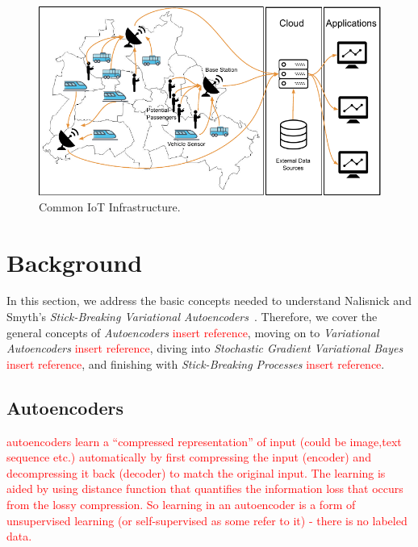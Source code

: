 \begin{figure}[h]
  \centering
  \includegraphics[width=\linewidth]{figs/iot_scenario}
  \caption{Common IoT Infrastructure.}
  \label{fig:iot-app-scenario}
\end{figure}
\section{Background}
\label{sec:background}
% 
% 

In this section, we address the basic concepts needed to understand Nalisnick and Smyth's \textit{Stick-Breaking Variational Autoencoders}~\cite{nalisnick2016stickbreaking}. Therefore, we cover the general concepts of \textit{Autoencoders} \textcolor{red}{insert reference}, moving on to \textit{Variational Autoencoders} \textcolor{red}{insert reference}, diving into \textit{Stochastic Gradient Variational Bayes} \textcolor{red}{insert reference}, and finishing with \textit{Stick-Breaking Processes} \textcolor{red}{insert reference}.

\subsection{Autoencoders}

\textcolor{red}{autoencoders learn a “compressed representation” of input (could be image,text sequence etc.) automatically by first compressing the input (encoder) and decompressing it back (decoder) to match the original input. The learning is aided by using distance function that quantifies the information loss that occurs from the lossy compression. So learning in an autoencoder is a form of unsupervised learning (or self-supervised as some refer to it) - there is no labeled data.}


